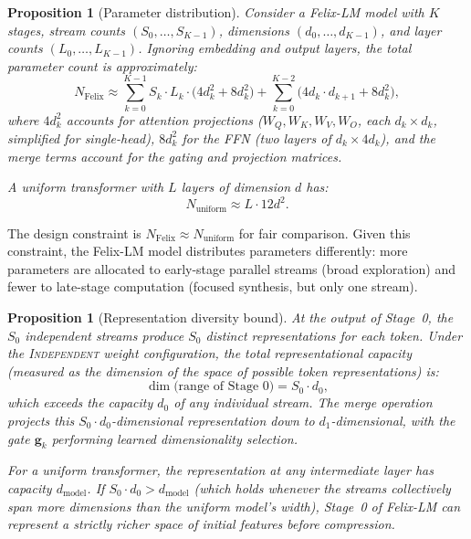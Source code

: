 \documentclass[11pt,a4paper]{article}
\theoremstyle{definition}
\theoremstyle{plain}
\newtheorem{proposition}[definition]{Proposition}
\theoremstyle{remark}
\begin{document}
\begin{proposition}[Parameter distribution]\label{prop:params}
Consider a Felix-LM model with $K$ stages, stream counts 
$(S_0, \ldots, S_{K-1})$, dimensions $(d_0, \ldots, d_{K-1})$, and layer 
counts $(L_0, \ldots, L_{K-1})$. Ignoring embedding and output layers, 
the total parameter count is approximately:
\begin{equation}\label{eq:param-count}
  N_{\text{Felix}} \approx \sum_{k=0}^{K-1} S_k \cdot L_k \cdot 
  \bigl(4d_k^2 + 8d_k^2\bigr) + \sum_{k=0}^{K-2} 
  \bigl(4d_k \cdot d_{k+1} + 8d_k^2\bigr),
\end{equation}
where $4d_k^2$ accounts for attention projections ($W_Q, W_K, W_V, W_O$, 
each $d_k \times d_k$, simplified for single-head), $8d_k^2$ for the FFN 
(two layers of $d_k \times 4d_k$), and the merge terms account for the 
gating and projection matrices.

A uniform transformer with $L$ layers of dimension $d$ has:
\begin{equation}
  N_{\text{uniform}} \approx L \cdot 12d^2.
\end{equation}
\end{proposition}

The design constraint is $N_{\text{Felix}} \approx N_{\text{uniform}}$ for 
fair comparison. Given this constraint, the Felix-LM model distributes 
parameters differently: more parameters are allocated to early-stage 
parallel streams (broad exploration) and fewer to late-stage computation 
(focused synthesis, but only one stream).

\begin{proposition}[Representation diversity bound]\label{prop:diversity}
At the output of Stage~0, the $S_0$ independent streams produce $S_0$ 
distinct representations for each token. Under the \textsc{Independent} 
weight configuration, the total representational capacity (measured as the 
dimension of the space of possible token representations) is:
\begin{equation}
  \dim\bigl(\text{range of Stage 0}\bigr) = S_0 \cdot d_0,
\end{equation}
which exceeds the capacity $d_0$ of any individual stream. The merge 
operation projects this $S_0 \cdot d_0$-dimensional representation down to 
$d_1$-dimensional, with the gate $\mathbf{g}_k$ performing learned 
dimensionality selection.

For a uniform transformer, the representation at any intermediate layer 
has capacity $d_{\text{model}}$. If $S_0 \cdot d_0 > d_{\text{model}}$ 
(which holds whenever the streams collectively span more dimensions than 
the uniform model's width), Stage~0 of Felix-LM can represent a strictly 
richer space of initial features before compression.
\end{proposition}
\end{document}

